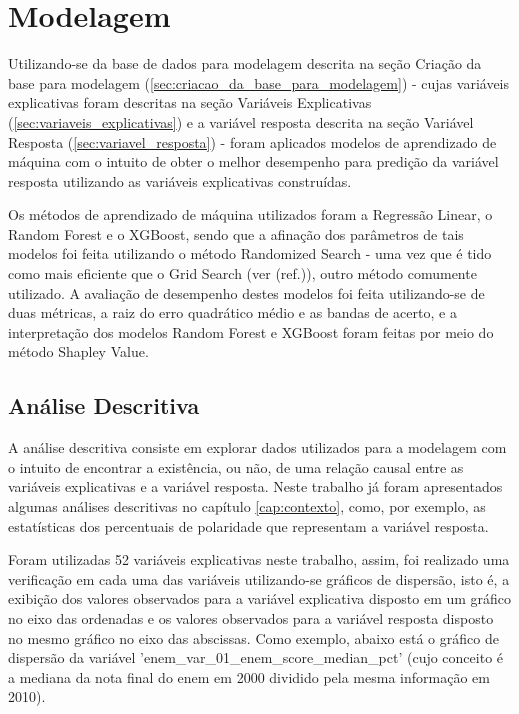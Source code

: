 \chapter{Modelagem}
\label{cap:modelagem}

Utilizando-se da base de dados para modelagem descrita na seção Criação da base para modelagem (\ref{sec:criacao_da_base_para_modelagem}) - cujas variáveis explicativas foram descritas na seção Variáveis Explicativas (\ref{sec:variaveis_explicativas}) e a variável resposta descrita na seção Variável Resposta (\ref{sec:variavel_resposta}) - foram aplicados modelos de aprendizado de máquina com o intuito de obter o melhor desempenho para predição da variável resposta utilizando as variáveis explicativas construídas.

Os métodos de aprendizado de máquina utilizados foram a Regressão Linear, o Random Forest e o XGBoost, sendo que a afinação dos parâmetros de tais modelos foi feita utilizando o método Randomized Search - uma vez que é tido como mais eficiente que o Grid Search (ver (ref.)), outro método comumente utilizado. A avaliação de desempenho destes modelos foi feita utilizando-se de duas métricas, a raiz do erro quadrático médio e as bandas de acerto, e a interpretação dos modelos Random Forest e XGBoost foram feitas por meio do método Shapley Value.

\section{Análise Descritiva}
\label{sec:analise_descritiva}

A análise descritiva consiste em explorar dados utilizados para a modelagem com o intuito de encontrar a existência, ou não, de uma relação causal entre as variáveis explicativas e a variável resposta. Neste trabalho já foram apresentados algumas análises descritivas no capítulo \ref{cap:contexto}, como, por exemplo, as estatísticas dos percentuais de polaridade que representam a variável resposta.

Foram utilizadas 52 variáveis explicativas neste trabalho, assim, foi realizado uma verificação em cada uma das variáveis utilizando-se gráficos de dispersão, isto é, a exibição dos valores observados para a variável explicativa disposto em um gráfico no eixo das ordenadas e os valores observados para a variável resposta disposto no mesmo gráfico no eixo das abscissas. Como exemplo, abaixo está o gráfico de dispersão da variável 'enem_var_01_enem_score_median_pct' (cujo conceito é a mediana da nota final do enem em 2000 dividido pela mesma informação em 2010).

